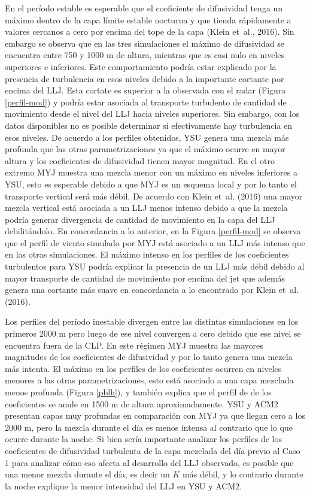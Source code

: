 \documentclass[12pt,spanish,oneside, a4paper]{book}
\begin{document}
En el período estable es esperable que el coeficiente de difusividad
tenga un máximo dentro de la capa límite estable nocturna y que tienda
rápidamente a valores cercanos a cero por encima del tope de la capa
(Klein et~al., 2016). Sin embargo se observa que en las tres
simulaciones el máximo de difusividad se encuentra entre 750 y 1000 m de
altura, mientras que es casi nulo en niveles superiores e inferiores.
Este comportamiento podría estar explicado por la presencia de
turbulencia en esos niveles debido a la importante cortante por encima
del LLJ. Esta cortate es superior a la observada con el radar (Figura
\ref{perfil-mod}) y podría estar asociada al transporte turbulento de
cantidad de movimiento desde el nivel del LLJ hacia niveles superiores.
Sin embargo, con los datos disponibles no es posible determinar si
efectivamente hay turbulencia en esos niveles. De acuerdo a los perfiles
obtenidos, YSU genera una mezcla más profunda que las otras
parametrizaciones ya que el máximo ocurre en mayor altura y los
coeficientes de difusividad tienen mayor magnitud. En el otro extremo
MYJ muestra una mezcla menor con un máximo en niveles inferiores a YSU,
esto es esperable debido a que MYJ es un esquema local y por lo tanto el
transporte vertical será más débil. De acuerdo con Klein et~al. (2016)
una mayor mezcla vertical está asociada a un LLJ menos intenso debido a
que la mezcla podría generar divergencia de cantidad de movimiento en la
capa del LLJ debilitándolo. En concordancia a lo anterior, en la Figura
\ref{perfil-mod} se observa que el perfil de viento simulado por MYJ
está asociado a un LLJ más intenso que en las otras simulaciones. El
máximo intenso en los perfiles de los coeficientes turbulentos para YSU
podría explicar la presencia de un LLJ más débil debido al mayor
transporte de cantidad de movimiento por encima del jet que además
genera una cortante más suave en concordancia a lo encontrado por Klein
et~al. (2016).

Los perfiles del período inestable divergen entre las distintas
simulaciones en los primeros 2000 m pero luego de ese nivel convergen a
cero debido que ese nivel se encuentra fuera de la CLP. En este régimen
MYJ muestra las mayores magnitudes de los coeficientes de difusividad y
por lo tanto genera una mezcla más intenta. El máximo en los perfiles de
los coeficientes ocurren en niveles menores a las otras
parametrizaciones, esto está asociado a una capa mezclada menos profunda
(Figura \ref{pblh}), y también explica que el perfil de de los
coeficientes se anule en 1500 m de altura aproximadamente. YSU y ACM2
presentan capas muy profundas en comparación con MYJ ya que llegan cero
a los 2000 m, pero la mezcla durante el día es menos intensa al
contrario que lo que ocurre durante la noche. Si bien sería importante
analizar los perfiles de los coeficientes de difusividad turbulenta de
la capa mezclada del día previo al Caso 1 para analizar cómo eso afecta
al desarrollo del LLJ observado, es posible que una menor mezcla durante
el día, es decir un \(K\) más débil, y lo contrario durante la noche
explique la menor intensidad del LLJ en YSU y ACM2.
\end{document}
